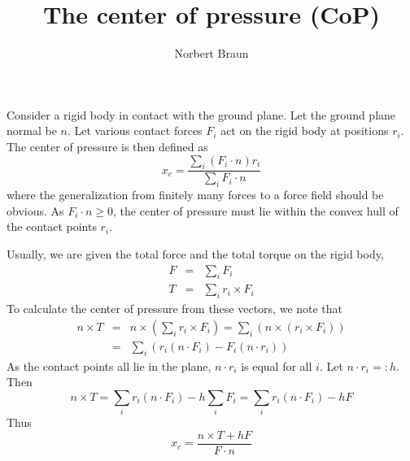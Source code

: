 \documentclass[a4paper]{article}
\title{The center of pressure (CoP)}
\author{Norbert Braun}
\begin{document}
\maketitle
Consider a rigid body in contact with the ground plane. Let the ground plane normal be $n$. Let various contact forces $F_i$ act on the rigid body at positions $r_i$. The center of pressure is then defined as
\begin{equation}
x_c = \frac{\sum_i (F_i \cdot n) r_i}{\sum_i F_i \cdot n}
\end{equation}
where the generalization from finitely many forces to a force field should be obvious. As $F_i \cdot n \ge 0$, the center of pressure must lie within the convex hull of the contact points $r_i$.

Usually, we are given the total force and the total torque on the rigid body,
\begin{eqnarray}
F &=& \sum_i F_i\\
T &=& \sum_i r_i \times F_i
\end{eqnarray}
To calculate the center of pressure from these vectors, we note that
\begin{eqnarray}
\nonumber n \times T &=& n \times \left( \sum_i r_i \times F_i \right) = \sum_i (n \times (r_i \times F_i))\\
&=& \sum_i \left( r_i (n \cdot F_i) - F_i (n \cdot r_i) \right)
\end{eqnarray}
As the contact points all lie in the plane, $n \cdot r_i$ is equal for all $i$. Let $n \cdot r_i =: h$. Then
\begin{equation}
n \times T = \sum_i r_i (n \cdot F_i) - h \sum_i F_i = \sum_i r_i (n \cdot F_i) - h F
\end{equation}
Thus
\begin{equation}
x_c = \frac{n \times T + h F}{F \cdot n}
\end{equation}
\end{document}
